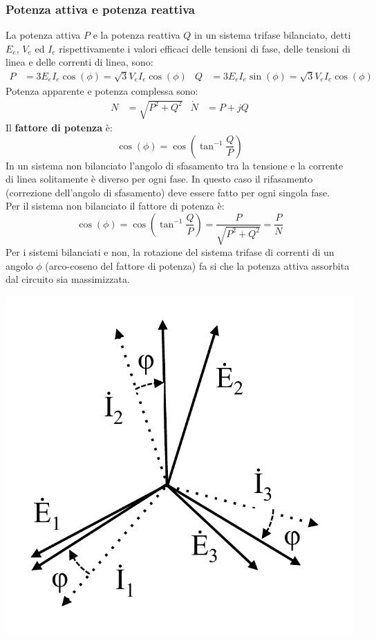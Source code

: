 \documentclass{article}
\begin{document}
\subsubsection{Potenza attiva e potenza reattiva}
La potenza attiva $P$ e la potenza reattiva $Q$ in un sistema trifase bilanciato,
detti $E_e$, $V_e$ ed $I_e$ rispettivamente i valori efficaci delle tensioni di fase, delle
tensioni di linea e delle correnti di linea, sono:
\begin{align*}
    P &= 3E_eI_e \cos(\phi) = \sqrt{3}V_eI_e \cos(\phi)
    &
    Q &= 3E_eI_e \sin(\phi) = \sqrt{3}V_eI_e \cos(\phi)
\end{align*}
Potenza apparente e potenza complessa sono:
\begin{align*}
    N &= \sqrt{P^2+Q^2} & \dot N &= P + jQ
\end{align*}
Il \textbf{fattore di potenza} è:
\[
    \cos(\phi) = \cos \left(\tan^{-1} \frac{Q}{P}\right)
\]
In un sistema non bilanciato l'angolo di sfasamento tra la tensione e la corrente di linea solitamente è diverso per ogni fase. In questo caso il rifasamento (correzione dell'angolo di sfasamento) deve essere fatto per ogni singola fase.\\
Per il sistema non bilanciato il fattore di potenza è:
\[
    \cos(\phi) = \cos \left(\tan^{-1} \frac{Q}{P}\right) = \frac{P}{\sqrt{P^2+Q^2}} = \frac{P}{N}
\]
Per i sistemi bilanciati e non, la rotazione del sistema trifase di correnti di un angolo $\phi$ (arco-coseno del fattore di potenza) fa si che la potenza attiva assorbita dal circuito sia massimizzata.
\begin{center}
    \includegraphics[scale=0.27]{Image/Potenza_sistemi_trifase_non_bilanciati_1.png}
\end{center}
\end{document}

